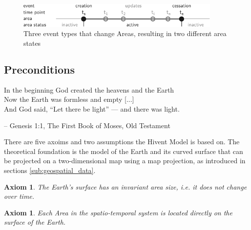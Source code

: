 \begin{figure}[H]
  \vspace{1em}
  \centering
  \includegraphics[width=0.9\textwidth]{graphics/development/hivent_model/area_states}
  \caption{Three event types that change Areas, resulting in two different area states}
  \label{fig:area_states}
\end{figure}




\subsection{Preconditions} %
\label{sub:preconditions}

\begin{quoteit}
In the beginning God created the heavens and the Earth \\
Now the Earth was formless and empty [...] \\
And God said, “Let there be light” --- and there was light.
\end{quoteit}
\vspace{-1em}
\hfill -- Genesis 1:1, The First Book of Moses, Old Testament

There are five axoims and two assumptions the Hivent Model is based on. The theoretical foundation is the model of the Earth and its curved surface that can be projected on a two-dimensional map using a map projection, as introduced in sections \ref{sub:geospatial_data}.

\vspace{-1.0em}
\newtheorem{invariant_surface}[assicounter]{Axiom}
\begin{invariant_surface}
\label{axm:invariant_surface}
  The Earth's surface has an invariant area size, i.e. it does not change over time.
\end{invariant_surface}

\vspace{-2.5em}
\newtheorem{area_on_surface}[assicounter]{Axiom}
\begin{area_on_surface}
\label{axm:area_on_surface}
  Each Area in the spatio-temporal system is located directly on the surface of the Earth.
\end{area_on_surface}

